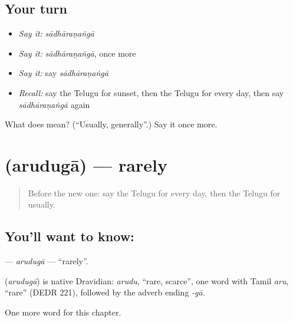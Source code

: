 \subsection*{Your turn}
\begin{itemize}
\raggedright
  \item \emph{Say it:} \emph{sādhāraṇaṅgā}
  \item \emph{Say it:} \emph{sādhāraṇaṅgā}, once more
  \item \emph{Say it:} say \emph{sādhāraṇaṅgā}
  \item \emph{Recall:} say the Telugu for sunset, then the Telugu for every day, then say \emph{sādhāraṇaṅgā} again
\end{itemize}

\begin{tcolorbox}[breakable,colback=teal!4,colframe=teal!35!black,title={Before you move on}]
What does  mean? (\textquotedblleft{}Usually, generally\textquotedblright{}.) Say it once more.
\end{tcolorbox}
\section[\texorpdfstring{\te{అరుదుగా} (arudugā)}{అరుదుగా (arudugā)}]{ (arudugā) — rarely}

\label{lesson:TE-C171-aruduga}



\begin{quote}
Before the new one: say the Telugu for every day, then the Telugu for usually.
\end{quote}

\subsection*{You'll want to know: }
\textbf{} — \emph{arudugā} — \textquotedblleft{}rarely\textquotedblright{}.

\begin{cousinweb}
\textbf{} (\emph{arudugā}) is native Dravidian: \emph{arudu}, \textquotedblleft{}rare, scarce\textquotedblright{}, one word with Tamil \emph{aru}, \textquotedblleft{}rare\textquotedblright{} (DEDR 221), followed by the adverb ending \emph{-gā}.
\end{cousinweb}

\begin{grammarlens}[title={What you've built}]
One more word for this chapter.
\end{grammarlens}

